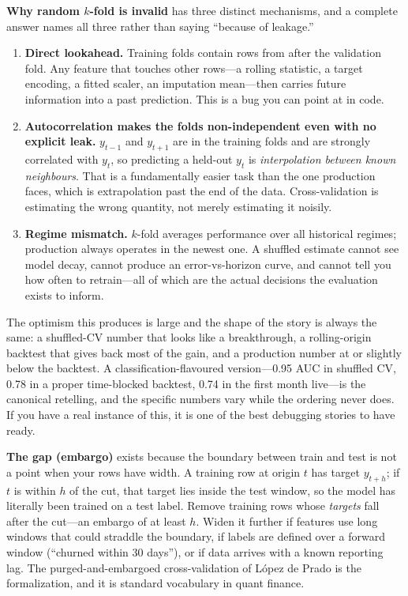 \textbf{Why random $k$-fold is invalid} has three distinct mechanisms, and a complete answer names all three rather than saying ``because of leakage.''

\begin{enumerate}
    \item \textbf{Direct lookahead.} Training folds contain rows from after the validation fold. Any feature that touches other rows---a rolling statistic, a target encoding, a fitted scaler, an imputation mean---then carries future information into a past prediction. This is a bug you can point at in code.
    \item \textbf{Autocorrelation makes the folds non-independent even with no explicit leak.} $y_{t-1}$ and $y_{t+1}$ are in the training folds and are strongly correlated with $y_t$, so predicting a held-out $y_t$ is \emph{interpolation between known neighbours}. That is a fundamentally easier task than the one production faces, which is extrapolation past the end of the data. Cross-validation is estimating the wrong quantity, not merely estimating it noisily.
    \item \textbf{Regime mismatch.} $k$-fold averages performance over all historical regimes; production always operates in the newest one. A shuffled estimate cannot see model decay, cannot produce an error-vs-horizon curve, and cannot tell you how often to retrain---all of which are the actual decisions the evaluation exists to inform.
\end{enumerate}

The optimism this produces is large and the shape of the story is always the same: a shuffled-CV number that looks like a breakthrough, a rolling-origin backtest that gives back most of the gain, and a production number at or slightly below the backtest. A classification-flavoured version---0.95 AUC in shuffled CV, 0.78 in a proper time-blocked backtest, 0.74 in the first month live---is the canonical retelling, and the specific numbers vary while the ordering never does. If you have a real instance of this, it is one of the best debugging stories to have ready.

\textbf{The gap (embargo)} exists because the boundary between train and test is not a point when your rows have width. A training row at origin $t$ has target $y_{t+h}$; if $t$ is within $h$ of the cut, that target lies inside the test window, so the model has literally been trained on a test label. Remove training rows whose \emph{targets} fall after the cut---an embargo of at least $h$. Widen it further if features use long windows that could straddle the boundary, if labels are defined over a forward window (``churned within 30 days''), or if data arrives with a known reporting lag. The purged-and-embargoed cross-validation of López de Prado is the formalization, and it is standard vocabulary in quant finance.


